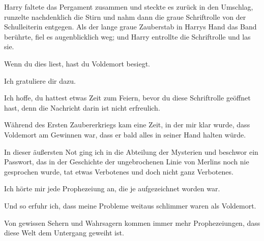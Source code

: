 \later

Harry faltete das Pergament zusammen und steckte es zurück in den Umschlag, runzelte nachdenklich die Stirn und nahm dann die graue Schriftrolle von der Schulleiterin entgegen. Als der lange graue Zauberstab in Harrys Hand das Band berührte, fiel es augenblicklich weg; und Harry entrollte die Schriftrolle und las sie.

\later

\begin{writtenNote}
Wenn du dies liest, hast du Voldemort besiegt.

Ich gratuliere dir dazu.

Ich hoffe, du hattest etwas Zeit zum Feiern, bevor du diese Schriftrolle geöffnet hast, denn die Nachricht darin ist nicht erfreulich.

Während des Ersten Zaubererkriegs kam eine Zeit, in der mir klar wurde, dass Voldemort am Gewinnen war, dass er bald alles in seiner Hand halten würde.

In dieser äußersten Not ging ich in die Abteilung der Mysterien und beschwor ein Passwort, das in der Geschichte der ungebrochenen Linie von Merlins noch nie gesprochen wurde, tat etwas Verbotenes und doch nicht ganz Verbotenes.

Ich hörte mir jede Prophezeiung an, die je aufgezeichnet worden war.

Und so erfuhr ich, dass meine Probleme weitaus schlimmer waren als Voldemort.

Von gewissen Sehern und Wahrsagern kommen immer mehr Prophezeiungen, dass diese Welt dem Untergang geweiht ist.


\end{writtenNote}

